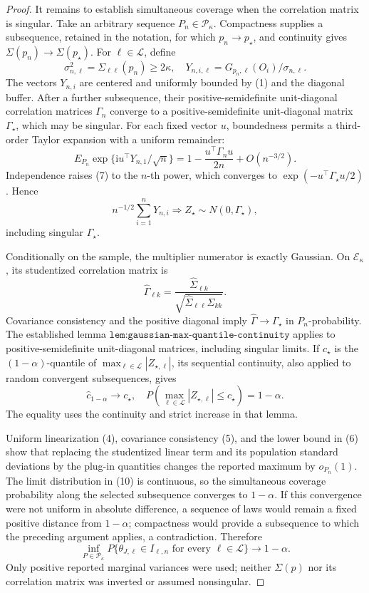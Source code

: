\documentclass{article}
\begin{document}
\begin{proof}
It remains to establish simultaneous coverage when the correlation matrix is singular.  Take an arbitrary sequence \(P_n\in\mathcal P_\kappa\).  Compactness supplies a subsequence, retained in the notation, for which \(p_n\to p_\star\), and continuity gives \(\Sigma(p_n)\to\Sigma(p_\star)\).  For \(\ell\in\mathcal L\), define
\[
 \sigma_{n,\ell}^2=\Sigma_{\ell\ell}(p_n)\geq2\kappa,
 \quad
 Y_{n,i,\ell}=G_{p_n,\ell}(O_i)/\sigma_{n,\ell}.
\tag{6}
\]
The vectors \(Y_{n,i}\) are centered and uniformly bounded by (1) and the diagonal buffer.  After a further subsequence, their positive-semidefinite unit-diagonal correlation matrices \(\Gamma_n\) converge to a positive-semidefinite unit-diagonal matrix \(\Gamma_\star\), which may be singular.  For each fixed vector \(u\), boundedness permits a third-order Taylor expansion with a uniform remainder:
\[
 E_{P_n}\exp\{\mathrm i u^\top Y_{n,1}/\sqrt n\}
 =1-\frac{u^\top\Gamma_nu}{2n}+O(n^{-3/2}).
\tag{7}
\]
Independence raises (7) to the \(n\)-th power, which converges to \(\exp(-u^\top\Gamma_\star u/2)\).  Hence
\[
 n^{-1/2}\sum_{i=1}^nY_{n,i}
 \Longrightarrow Z_\star\sim N(0,\Gamma_\star),
\tag{8}
\]
including singular \(\Gamma_\star\).

Conditionally on the sample, the multiplier numerator is exactly Gaussian.  On \(\mathcal E_\kappa\), its studentized correlation matrix is
\[
 \widehat\Gamma_{\ell k}
 =\frac{\widehat\Sigma_{\ell k}}
 {\sqrt{\widehat\Sigma_{\ell\ell}\widehat\Sigma_{kk}}}.
\tag{9}
\]
Covariance consistency and the positive diagonal imply \(\widehat\Gamma\to\Gamma_\star\) in \(P_n\)-probability.  The established lemma \(\texttt{lem:gaussian-max-quantile-continuity}\) applies to positive-semidefinite unit-diagonal matrices, including singular limits.  If \(c_\star\) is the \((1-\alpha)\)-quantile of \(\max_{\ell\in\mathcal L}|Z_{\star,\ell}|\), its sequential continuity, also applied to random convergent subsequences, gives
\[
 \widehat c_{1-\alpha}\to c_\star,
 \quad
 P\!\left(\max_{\ell\in\mathcal L}|Z_{\star,\ell}|\leq c_\star\right)
 =1-\alpha.
\tag{10}
\]
The equality uses the continuity and strict increase in that lemma.

Uniform linearization (4), covariance consistency (5), and the lower bound in (6) show that replacing the studentized linear term and its population standard deviations by the plug-in quantities changes the reported maximum by \(o_{P_n}(1)\).  The limit distribution in (10) is continuous, so the simultaneous coverage probability along the selected subsequence converges to \(1-\alpha\).  If this convergence were not uniform in absolute difference, a sequence of laws would remain a fixed positive distance from \(1-\alpha\); compactness would provide a subsequence to which the preceding argument applies, a contradiction.  Therefore
\[
 \inf_{P\in\mathcal P_\kappa}
 P\{\theta_{J,\ell}\in I_{\ell,n}\text{ for every }\ell\in\mathcal L\}
 \longrightarrow1-\alpha.
\tag{11}
\]
Only positive reported marginal variances were used; neither \(\Sigma(p)\) nor its correlation matrix was inverted or assumed nonsingular.
\end{proof}
\end{document}
